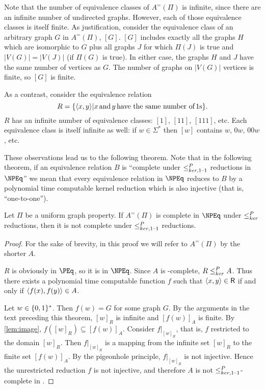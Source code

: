 Note that the number of equivalence classes of $A^=(\Pi)$ is infinite, since there are an infinite number of undirected graphs.
However, each of those equivalence classes is itself finite.
As justification, consider the equivalence class of an arbitrary graph $G$ in $A^=(\Pi)$, $[G]$.
$[G]$ includes exactly all the graphs $H$ which are isomorphic to $G$ plus all graphs $J$ for which $\Pi(J)$ is true and $|V(G)|=|V(J)|$ (if $\Pi(G)$ is true).
In either case, the graphs $H$ and $J$ have the same number of vertices as $G$.
The number of graphs on $|V(G)|$ vertices is finite, so $[G]$ is finite.

As a contrast, consider the equivalence relation
\begin{displaymath}
  R=\{\langle x,y\rangle|x\,\text{and}\,y\,\text{have the same number of}\,1\textnormal{s}\}.
\end{displaymath}
$R$ has an infinite number of equivalence classes: $[1]$, $[11]$, $[111]$, etc.
Each equivalence class is itself infinite as well: if $w\in\Sigma^*$ then $[w]$ contains $w$, $0w$, $00w$, etc.

These observations lead us to the following theorem.
Note that in the following theorem, if an equivalence relation $B$ is ``complete under $\leq^{P}_{ker,1\text{--}1}$ reductions in $\NPEq$'' we mean that every equivalence relation in $\NPEq$ reduces to $B$ by a polynomial time computable kernel reduction which is also injective (that is, ``one-to-one'').

\begin{theorem}
  Let $\Pi$ be a uniform graph property.
  If $A^=(\Pi)$ is complete in $\NPEq$ under $\leq^{P}_{ker}$ reductions, then it is not complete under $\leq^{P}_{ker,1\text{--}1}$ reductions.
\end{theorem}
\begin{proof}
  For the sake of brevity, in this proof we will refer to $A^=(\Pi)$ by the shorter $A$.

  $R$ is obviously in $\PEq$, so it is in $\NPEq$.
  Since $A$ is \NPEq-complete, $R\leq^{P}_{ker} A$.
  Thus there exists a polynomial time computable function $f$ such that $\langle x,y\rangle\in{\ensuremath{\mathsf{R}}}$ if and only if $\langle f(x),f(y)\rangle\in A$.

  Let $w\in\{0, 1\}^{*}$.
  Then $f(w)=G$ for some graph $G$.
  By the arguments in the text preceding this theorem, $[w]_R$ is infinite and $[f(w)]_A$ is finite.
  By \autoref{lem:image}, $f([w]_R)\subseteq [f(w)]_A$.
  Consider $f|_{[w]_R}$, that is, $f$ restricted to the domain $[w]_R$.
  Then $f|_{[w]_R}$ is a mapping from the infinite set $[w]_R$ to the finite set $[f(w)]_A$.
  By the pigeonhole principle, $f|_{[w]_R}$ is not injective.
  Hence the unrestricted reduction $f$ is not injective, and therefore $A$ is not $\leq^{P}_{ker,1\text{--}1}$-complete in \NPEq.
\end{proof}
